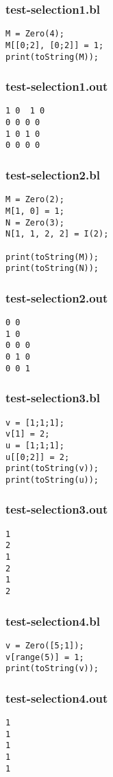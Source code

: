 \subsubsection{test-selection1.bl}
\begin{lstlisting}
M = Zero(4);
M[[0;2], [0;2]] = 1;
print(toString(M));\end{lstlisting}
\subsubsection{test-selection1.out}
\begin{lstlisting}
1 0  1 0
0 0 0 0
1 0 1 0
0 0 0 0\end{lstlisting}
\subsubsection{test-selection2.bl}
\begin{lstlisting}
M = Zero(2);
M[1, 0] = 1;
N = Zero(3);
N[1, 1, 2, 2] = I(2);

print(toString(M));
print(toString(N));\end{lstlisting}
\subsubsection{test-selection2.out}
\begin{lstlisting}
0 0
1 0
0 0 0
0 1 0
0 0 1\end{lstlisting}
\subsubsection{test-selection3.bl}
\begin{lstlisting}
v = [1;1;1];
v[1] = 2;
u = [1;1;1];
u[[0;2]] = 2;
print(toString(v));
print(toString(u));\end{lstlisting}
\subsubsection{test-selection3.out}
\begin{lstlisting}
1
2
1
2
1
2
\end{lstlisting}
\subsubsection{test-selection4.bl}
\begin{lstlisting}
v = Zero([5;1]);
v[range(5)] = 1;
print(toString(v));
\end{lstlisting}
\subsubsection{test-selection4.out}
\begin{lstlisting}
1
1
1
1
1\end{lstlisting}
